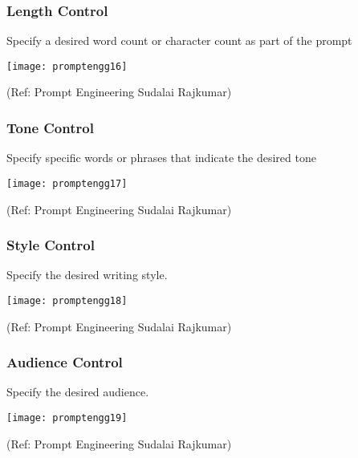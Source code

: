 \begin{frame}[fragile]\frametitle{Length Control}

Specify a desired word count or character count as part of the prompt

\begin{center}
\texttt{[image: promptengg16]}

{\tiny (Ref: Prompt Engineering Sudalai Rajkumar)}

\end{center}		

\end{frame}

\begin{frame}[fragile]\frametitle{Tone Control}

Specify specific words or phrases that indicate the desired tone

\begin{center}
\texttt{[image: promptengg17]}

{\tiny (Ref: Prompt Engineering Sudalai Rajkumar)}

\end{center}		

\end{frame}

\begin{frame}[fragile]\frametitle{Style Control}

Specify the desired writing style.

\begin{center}
\texttt{[image: promptengg18]}

{\tiny (Ref: Prompt Engineering Sudalai Rajkumar)}

\end{center}		
	
\end{frame}

\begin{frame}[fragile]\frametitle{Audience Control}

Specify the desired audience.

\begin{center}
\texttt{[image: promptengg19]}

{\tiny (Ref: Prompt Engineering Sudalai Rajkumar)}

\end{center}		

\end{frame}

